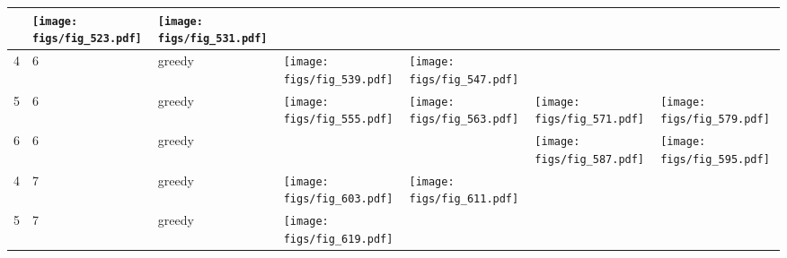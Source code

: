 \documentclass[oneside,canadian,landscape]{article}
\begin{document}
\begin{center}
\begin{longtable}{|l|l|l||l|l|l|l|}
\begin{minipage}{3.5cm}
\end{minipage}
&\begin{minipage}{3.5cm}
\texttt{[image: figs/fig\_523.pdf]}
\end{minipage}
&\begin{minipage}{3.5cm}
\texttt{[image: figs/fig\_531.pdf]}
\end{minipage}
\\ \hline
4&6&greedy&\begin{minipage}{3.5cm}
\texttt{[image: figs/fig\_539.pdf]}
\end{minipage}
&\begin{minipage}{3.5cm}
\texttt{[image: figs/fig\_547.pdf]}
\end{minipage}
&&\\ \hline
5&6&greedy&\begin{minipage}{3.5cm}
\texttt{[image: figs/fig\_555.pdf]}
\end{minipage}
&\begin{minipage}{3.5cm}
\texttt{[image: figs/fig\_563.pdf]}
\end{minipage}
&\begin{minipage}{3.5cm}
\texttt{[image: figs/fig\_571.pdf]}
\end{minipage}
&\begin{minipage}{3.5cm}
\texttt{[image: figs/fig\_579.pdf]}
\end{minipage}
\\ \hline
6&6&greedy&&&\begin{minipage}{3.5cm}
\texttt{[image: figs/fig\_587.pdf]}
\end{minipage}
&\begin{minipage}{3.5cm}
\texttt{[image: figs/fig\_595.pdf]}
\end{minipage}
\\ \hline
4&7&greedy&\begin{minipage}{3.5cm}
\texttt{[image: figs/fig\_603.pdf]}
\end{minipage}
&\begin{minipage}{3.5cm}
\texttt{[image: figs/fig\_611.pdf]}
\end{minipage}
&&\\ \hline
5&7&greedy&\begin{minipage}{3.5cm}
\texttt{[image: figs/fig\_619.pdf]}
\end{minipage}
&\begin{minipage}{3.5cm}

\end{minipage}
\end{longtable}
\end{center}
\end{document}
